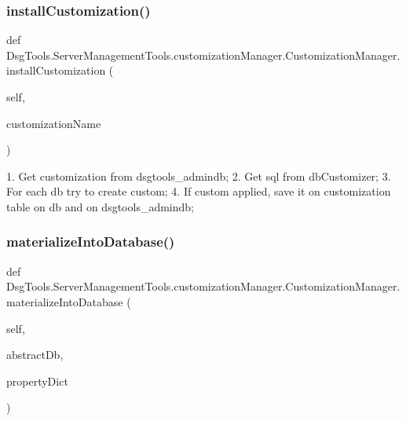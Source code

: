 \subsubsection{\texorpdfstring{install\+Customization()}{installCustomization()}}
{\footnotesize\ttfamily def Dsg\+Tools.\+Server\+Management\+Tools.\+customization\+Manager.\+Customization\+Manager.\+install\+Customization (\begin{DoxyParamCaption}\item[{}]{self,  }\item[{}]{customization\+Name }\end{DoxyParamCaption})}

\begin{DoxyVerb}1. Get customization from dsgtools_admindb;
2. Get sql from dbCustomizer;
3. For each db try to create custom;
4. If custom applied, save it on customization table on db and on dsgtools_admindb;
\end{DoxyVerb}
 \mbox{\label{class_dsg_tools_1_1_server_management_tools_1_1customization_manager_1_1_customization_manager_a6d267613675bed63c0e45cba18f277c1}} 
\subsubsection{\texorpdfstring{materialize\+Into\+Database()}{materializeIntoDatabase()}}
{\footnotesize\ttfamily def Dsg\+Tools.\+Server\+Management\+Tools.\+customization\+Manager.\+Customization\+Manager.\+materialize\+Into\+Database (\begin{DoxyParamCaption}\item[{}]{self,  }\item[{}]{abstract\+Db,  }\item[{}]{property\+Dict }\end{DoxyParamCaption})}

